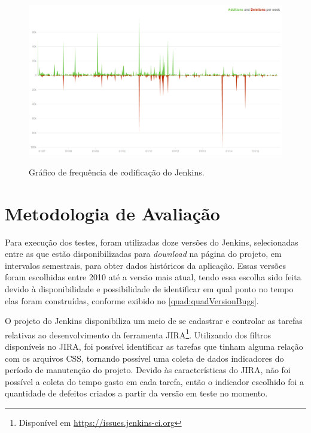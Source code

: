 \begin{figure}[!htb]
	\centering
	\caption{Gráfico de frequência de codificação do Jenkins.}
	\includegraphics[width=1\textwidth]{./04-figuras/code_freq_graph}
	\label{fig:codeFreqGraph}
\end{figure}

\section{Metodologia de Avaliação}

Para execução dos testes, foram utilizadas doze versões do Jenkins, selecionadas entre as que estão disponibilizadas para \textit{download} na página do projeto, em intervalos semestrais, para obter dados históricos da aplicação. Essas versões foram escolhidas entre 2010 até a versão mais atual, tendo essa escolha sido feita devido à disponibilidade e possibilidade de identificar em qual ponto no tempo elas foram construídas, conforme exibido no \autoref{quad:quadVersionBugs}.




O projeto do Jenkins disponibiliza um meio de se cadastrar e controlar as tarefas relativas ao desenvolvimento da ferramenta JIRA\footnote{Disponível em \url{https://issues.jenkins-ci.org}}. Utilizando dos filtros disponíveis no JIRA, foi possível identificar as tarefas que tinham alguma relação com os arquivos CSS, tornando possível uma coleta de dados indicadores do período de manutenção do projeto. Devido às características do JIRA, não foi possível a coleta do tempo gasto em cada tarefa, então o indicador escolhido foi a quantidade de defeitos criados a partir da versão em teste no momento.

